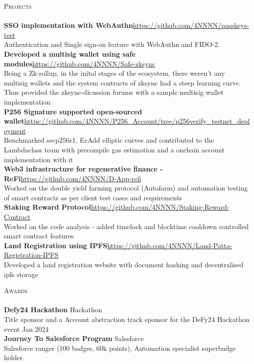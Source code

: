 \documentclass[a4paper]{article}
\newcommand{\lineunder} {
    \vspace*{-8pt} \\
    \hspace*{-18pt} \hrulefill \\
}
\newcommand{\header} [1] {
    {\hspace*{-18pt}\vspace*{6pt} \textsc{#1}}
    \vspace*{-6pt} \lineunder
}
\begin{document}
\header{Projects}
{\textbf{SSO implementation with WebAuthn}}\hfill \url{https://github.com/4NNNN/passkeys-test}\\
Authentication and Single sign-on feature with WebAuthn and FIDO-2.\\
\vspace*{2mm}
{\textbf{Developed a multisig wallet using safe modules}}\hfill \url{https://github.com/4NNNN/Safe-zksync}\\
Being a Zk-rollup, in the inital stages of the ecosystem, there weren't any multisig wallets and the system contracts of zksync had a steep learning curve. Thus provided the zksync-dicussion forums with a sample multisig wallet implementation\\
\vspace*{2mm}
{\textbf{P256 Signature supported open-sourced wallet}}\hfill \url{https://github.com/4NNNN/P256_Account/tree/p256verify_testnet_deployment}\\
Benchmarked secp256r1, EcAdd elliptic curves and contributed to the Lambdaclass team with precompile gas estimation and a onchain account implementation with it\\
\vspace*{2mm}
{\textbf{Web3 infrastructure for regenerative finance - ReFi}}\hfill \url{https://github.com/4NNNN/D-App-refi}\\
Worked on the double yield farming protocol (Autofarm) and automation testing of smart contracts as per client test cases and requirements\\
\vspace*{2mm}
{\textbf{Staking Reward Protocol}}\hfill \url{https://github.com/4NNNN/Staking-Reward-Contract}\\
Worked on the code analysis - added timelock and blocktime cooldown controlled smart contract features\\
\vspace*{2mm}
{\textbf{Land Registration using IPFS}}\hfill \url{https://github.com/4NNNN/Land-Patta-Registration-IPFS}\\
Developed a land registration website with document hashing and decentralised ipfs storage\\
\vspace*{2mm}

\header{Awards}
\textbf{Defy24 Hackathon} \hfill Hackathon\\
Title sponsor and a Account abstraction track sponsor for the DeFy24 Hackathon event \hfill Jan 2024\\
\vspace*{2mm}
\textbf{Journey To Salesforce Program} \hfill Salesforce\\
Salesforce ranger (100 badges, 60k points), Automation specialist superbadge holder
\vspace*{2mm}

\
\end{document}
